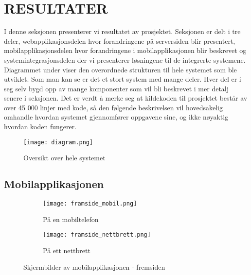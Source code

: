 \documentclass[../main.tex]{subfiles}
\begin{document}
\chapter{RESULTATER}

I denne seksjonen presenterer vi resultatet av prosjektet. Seksjonen er delt i tre deler, webapplikasjonsdelen hvor forandringene på serversiden blir presentert, mobilapplikasjonsdelen hvor forandringene i mobilapplikasjonen blir beskrevet og systemintegrasjonsdelen der vi presenterer løsningene til de integrerte systemene.\newline
\newline
Diagrammet under viser den overordnede strukturen til hele systemet som ble utviklet. Som man kan se er det et stort system med mange deler. Hver del er i seg selv bygd opp av mange komponenter som vil bli beskrevet i mer detalj senere i seksjonen. Det er verdt å merke seg at kildekoden til prosjektet består av over 45 000 linjer med kode, så den følgende beskrivelsen vil hovedsakelig omhandle hvordan systemet gjennomfører oppgavene sine, og ikke nøyaktig hvordan koden fungerer.

\begin{figure}[H]
  \centering
  \texttt{[image: diagram.png]}
  \caption{Oversikt over hele systemet}
\end{figure}

\section{Mobilapplikasjonen}

\begin{figure}[H]
        \centering
        \begin{subfigure}[b]{0.3\textwidth}
                \centering
                \texttt{[image: framside\_mobil.png]}
                \caption{På en mobiltelefon}
        \end{subfigure}
        \quad
        \begin{subfigure}[b]{0.3\textwidth}
                \centering
                \texttt{[image: framside\_nettbrett.png]}
                \caption{På ett nettbrett}
        \end{subfigure}
        \caption{Skjermbilder av mobilapplikasjonen - fremsiden}
\end{figure}
\end{document}
